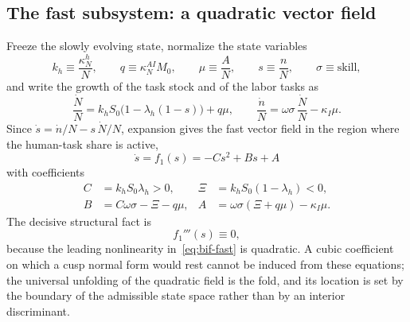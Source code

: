 \documentclass[review,12pt]{elsarticle}
\theoremstyle{plain}
\theoremstyle{definition}
\theoremstyle{remark}
\begin{document}
\subsection{The fast subsystem: a quadratic vector field}
Freeze the slowly evolving state, normalize the state variables
\begin{equation}
k_h\equiv\frac{\kappa_N^h}{N},\qquad q\equiv\kappa_N^{AI}M_0,\qquad
\mu\equiv\frac{A}{N},\qquad s\equiv\frac{n}{N},\qquad \sigma\equiv\text{skill},
\label{eq:bif-norm}
\end{equation}
and write the growth of the task stock and of the labor tasks as
\begin{equation}
\frac{\dot N}{N}=k_hS_0\bigl(1-\lambda_h(1-s)\bigr)+q\mu,\qquad
\frac{\dot n}{N}=\omega\sigma\,\frac{\dot N}{N}-\kappa_I\mu.
\label{eq:bif-growth}
\end{equation}
Since $\dot s=\dot n/N-s\,\dot N/N$, expansion gives the fast vector field in the region where the human-task share is active,
\begin{equation}
\boxed{\ \dot s=f_1(s)=-Cs^2+Bs+A\ }
\label{eq:bif-fast}
\end{equation}
with coefficients
\begin{align}
C&=k_hS_0\lambda_h>0, & \Xi&=k_hS_0(1-\lambda_h)<0,\nonumber\\
B&=C\omega\sigma-\Xi-q\mu, &
A&=\omega\sigma(\Xi+q\mu)-\kappa_I\mu.
\label{eq:bif-coeff}
\end{align}
The decisive structural fact is
\begin{equation}
f_1'''(s)\equiv 0,
\label{eq:bif-third}
\end{equation}
because the leading nonlinearity in~\eqref{eq:bif-fast} is quadratic. A cubic coefficient on which a cusp normal form would rest cannot be induced from these equations; the universal unfolding of the quadratic field is the fold, and its location is set by the boundary of the admissible state space rather than by an interior discriminant.
\end{document}
